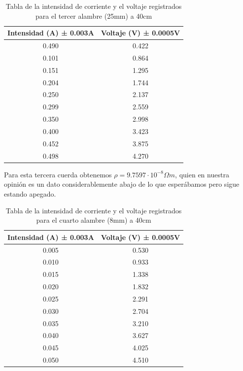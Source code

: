\documentclass[article,12pt]{elsarticle}
\begin{document}
    \begin{table}[H]
\begin{tabular}{|c|c|}
\hline
Intensidad (A) ± 0.003A & Voltaje (V) ± 0.0005V \\ \hline
0.490                   & 0.422                 \\ \hline
0.101                   & 0.864                 \\ \hline
0.151                   & 1.295                 \\ \hline
0.204                   & 1.744                 \\ \hline
0.250                   & 2.137                 \\ \hline
0.299                   & 2.559                 \\ \hline
0.350                   & 2.998                 \\ \hline
0.400                   & 3.423                 \\ \hline
0.452                   & 3.875                 \\ \hline
0.498                   & 4.270                 \\ \hline
\end{tabular}
\caption{Tabla de la intensidad de corriente y el voltaje registrados para el tercer alambre (25mm) a 40cm}
\end{table}

Para esta tercera cuerda obtenemos $\rho = 9.7597 \cdot 10^{-8} \Omega m$, quien en nuestra opinión es un dato considerablemente abajo de lo que esperábamos pero sigue estando apegado.

    \begin{table}[H]
\begin{tabular}{|c|c|}
\hline
Intensidad (A) ± 0.003A & Voltaje (V) ± 0.0005V \\ \hline
0.005                   & 0.530                  \\ \hline
0.010                    & 0.933                 \\ \hline
0.015                   & 1.338                 \\ \hline
0.020                    & 1.832                 \\ \hline
0.025                   & 2.291                 \\ \hline
0.030                    & 2.704                 \\ \hline
0.035                   & 3.210                  \\ \hline
0.040                    & 3.627                 \\ \hline
0.045                   & 4.025                 \\ \hline
0.050                    & 4.510                  \\ \hline
\end{tabular}
\caption{Tabla de la intensidad de corriente y el voltaje registrados para el cuarto alambre (8mm) a 40cm}
\end{table}
\end{document}
